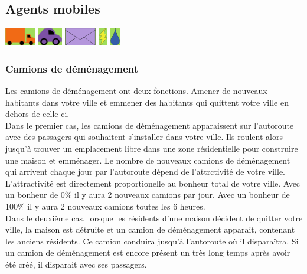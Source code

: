 \documentclass[11pt]{report}
\begin{document}
\newpage
\subsection{Agents mobiles}
\begin{center}
	\includegraphics[height=30px]{movingtruck}
	\hspace{1cm}
	\includegraphics[height=30px]{car}
	\hspace{1cm}
	\includegraphics[height=30px]{offer}
	\hspace{1cm}
	\includegraphics[height=30px]{electricity}
	\includegraphics[height=30px]{water}
\end{center}

\subsubsection{Camions de déménagement}
Les camions de déménagement ont deux fonctions. Amener de nouveaux habitants dans votre ville et emmener des habitants qui quittent votre ville en dehors de celle-ci.\\
Dans le premier cas, les camions de déménagement apparaissent sur l'autoroute avec des passagers qui souhaitent s'installer dans votre ville. Ils roulent alors jusqu'à trouver un emplacement libre dans une zone résidentielle pour construire une maison et emménager.
Le nombre de nouveaux camions de déménagement qui arrivent chaque jour par l'autoroute dépend de l'attrctivité de votre ville. L'attractivité est directement proportionelle au bonheur total de votre ville. Avec un bonheur de 0\% il y aura 2 nouveaux camions par jour. Avec un bonheur de 100\% il y aura 2 nouveaux camions toutes les 6 heures.\\
Dans le deuxième cas, lorsque les résidents d'une maison décident de quitter votre ville, la maison est détruite et un camion de déménagement apparait, contenant les anciens résidents. Ce camion conduira jusqu'à l'autoroute où il disparaîtra. Si un camion de déménagement est encore présent un très long temps après avoir été créé, il disparait avec ses passagers.
\end{document}
